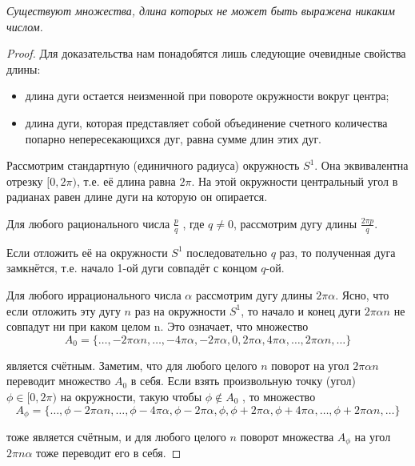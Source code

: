 \begin{theorem}
\textit{Существуют множества, длина которых не может быть выражена никаким числом.}
\end{theorem}
\begin{proof}
Для доказательства нам понадобятся лишь следующие очевидные свойства длины:
\begin{itemize}
\item длина дуги остается неизменной при повороте окружности вокруг
центра;
\item длина дуги, которая представляет собой объединение счетного количества попарно непересекающихся дуг, равна сумме длин этих
дуг.	
\end{itemize}	

Рассмотрим стандартную (единичного радиуса) окружность $S^1$. Она эквивалентна отрезку $[0, 2\pi)$, т.е. её длина равна $2\pi$. На этой окружности центральный угол в радианах равен длине дуги на которую он опирается.

Для любого рационального числа $\frac{p}{q}$ , где $q\ne 0$, рассмотрим дугу длины $\frac{2\pi p}{q}$.

Если отложить её на окружности $S^1$ последовательно $q$ раз, то полученная дуга замкнётся, т.е. начало 1-ой дуги совпадёт с концом $q$-ой.

Для любого иррационального числа $\alpha$ рассмотрим дугу длины $2\pi\alpha$. Ясно, что если отложить эту дугу $n$ раз на окружности $S^1$, то начало и конец дуги $2\pi\alpha n$ не совпадут ни при каком целом n. Это означает, что множество
\begin{equation*}
	A_0 = \{\ldots, -2\pi\alpha n, \ldots , -4\pi\alpha, -2\pi\alpha, 0, 2\pi\alpha, 4\pi\alpha, \ldots , 2\pi\alpha n, \ldots\}
\end{equation*}

является счётным. Заметим, что для любого целого $n$ поворот на угол $2\pi\alpha n$
переводит множество $A_0$ в себя.
Если взять произвольную точку (угол) $\phi \in [0, 2\pi)$ на окружности, такую чтобы $\phi \notin A_0$ , то множество
\begin{equation*}
	A_\phi = \{\ldots , \phi - 2\pi\alpha n, \ldots , \phi - 4\pi\alpha, \phi - 2\pi\alpha, \phi, \phi + 2\pi\alpha, \phi + 4\pi\alpha, \ldots , \phi + 2\pi\alpha n, \ldots \}
\end{equation*}

тоже является счётным, и для любого целого $n$ поворот множества $A_\phi$ на угол $2\pi n\alpha$ тоже переводит его в себя. 


\end{proof}

